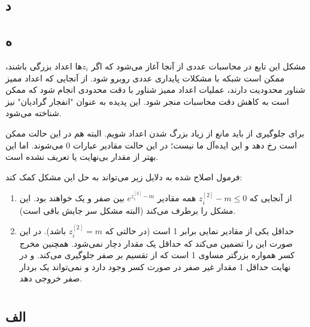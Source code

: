 \documentclass{article}
\begin{document}
\subsection{د}
\subsection{ه}
مشکل این تابع در محاسبات عددی از آنجا آغاز می‌شود که اگر $z_i$ها اعداد بزرگی باشند، ممکن است شبکه با مشکلات پایداری عددی روبرو شود. از آنجایی که اعداد ممیز شناور محدودیت دارند، عملیات اعداد ممیز شناور با دقت محدودی انجام شود که ممکن است به کاهش دقت محاسبات منجر شود. این پدیده به عنوان "انفجار گرادیان" نیز شناخته می‌شود.

برای جلوگیری از  باید مانع از زیاد بزرگ شدن اعداد شویم. البته  هم در این حالت ممکن است رخ دهد و این ایده‌آل ما نیست؛ در این حالت مقادیر عبارات 0 می‌شوند. اما این بهتر از مقدار بی‌نهایت یا تعریف نشده است.

فرمول اصلاح شده به دلایل زیر می‌تواند به حل این مشکل کمک کند:
\begin{enumerate}
\item از آنجایی که
$z^{[2]}_i - m \le 0$
همه مقادیر
$e ^ {z ^ {[2]}_i - m}$
بین صفر و یک خواهند بود. این مشکل  را برطرف می‌کند (البته مشکل  سر جایش باقی است).
\item حداقل یکی از مقادیر نمایی برابر 1 است (در حالتی که
$z^{[2]}_i = m$
باشد). در این صورت این را تضمین می‌کند که حداقل یک مقدار دچار  نمی‌شود. همچنین مخرج کسر همواره بزرگتر مساوی 1 است که از تقسیم بر صفر جلوگیری می‌کند. و در نهایت حداقل 1 مقدار غیر صفر در صورت کسر وجود دارد و  نمی‌تواند یک بردار صفر خروجی دهد.
\end{enumerate}






\newpage




\section{}
\subsection{الف}
\end{document}
